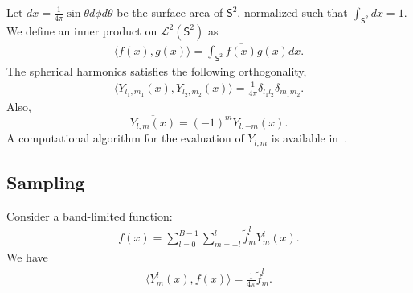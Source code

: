 \documentclass[onecolumn,11pt]{IEEEtran}
\newcommand{\pair}[1]{\ensuremath{\langle #1 \rangle}}
\newcommand{\Sph}{\ensuremath{\mathsf{S}}}
\begin{document}
Let $dx=\frac{1}{4\pi} \sin\theta d\phi d\theta$ be the surface area of $\Sph^2$, normalized such that $\int_{\Sph^2} dx =1$. 
We define an inner product on $\mathcal{L}^2(\Sph^2)$ as
\begin{align*}
    \pair{ f(x), g(x) } = \int_{\Sph^2} \overline{f(x)}g(x) dx.
\end{align*}
The spherical harmonics satisfies the following orthogonality,
\begin{align*}
    \pair{ Y_{l_1,m_1}(x), Y_{l_2,m_2}(x)} = \frac{1}{4\pi} \delta_{l_1l_2} \delta_{m_1m_2}.
\end{align*}
Also,
\[
    \overline{Y_{l,m}(x)} = (-1)^m Y_{l,-m}(x).
\]
A computational algorithm for the evaluation of $Y_{l,m}$ is available in~\cite{PreTeu07}.

\subsection{Sampling}

Consider a band-limited function:
\begin{align*}
    f(x) = \sum_{l=0}^{B-1} \sum_{m=-l}^l \tilde f^l_m Y^l_m(x).
\end{align*}
We have
\begin{align*}
    \pair{ Y^l_m(x), f(x) } = \frac{1}{4\pi} \tilde f^l_m.
\end{align*}
\end{document}
